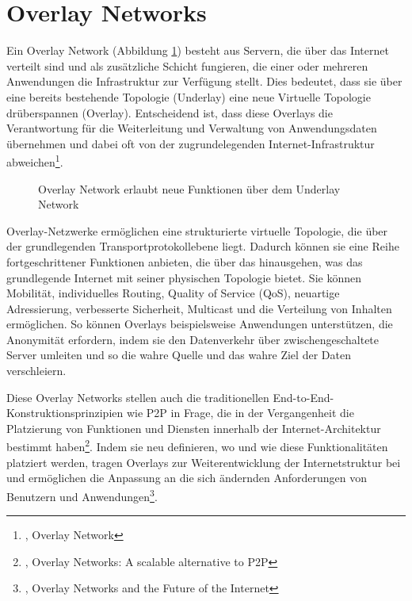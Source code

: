 \section{Overlay Networks}
\label{chap:overlay_networks}

Ein Overlay Network (Abbildung \ref{imgs:overlay_network}) besteht aus Servern, die über das Internet verteilt sind und als zusätzliche Schicht fungieren, die einer oder mehreren Anwendungen die Infrastruktur zur Verfügung stellt. Dies bedeutet, dass sie über eine bereits bestehende Topologie (Underlay) eine neue Virtuelle Topologie drüberspannen (Overlay). Entscheidend ist, dass diese Overlays die Verantwortung für die Weiterleitung und Verwaltung von Anwendungsdaten übernehmen und dabei oft von der zugrundelegenden Internet-Infrastruktur abweichen\footnote{\cite{OverlayNetwork}, Overlay Network}.

\begin{figure}[h!]
    \centering
    
    \caption{Overlay Network erlaubt neue Funktionen über dem Underlay Network}
    \label{imgs:overlay_network}
\end{figure}

Overlay-Netzwerke ermöglichen eine strukturierte virtuelle Topologie, die über der grundlegenden Transportprotokollebene liegt. Dadurch können sie eine Reihe fortgeschrittener Funktionen anbieten, die über das hinausgehen, was das grundlegende Internet mit seiner physischen Topologie bietet. Sie können Mobilität, individuelles Routing, Quality of Service (QoS), neuartige Adressierung, verbesserte Sicherheit, Multicast und die Verteilung von Inhalten ermöglichen. So können Overlays beispielsweise Anwendungen unterstützen, die Anonymität erfordern, indem sie den Datenverkehr über zwischengeschaltete Server umleiten und so die wahre Quelle und das wahre Ziel der Daten verschleiern.

Diese Overlay Networks stellen auch die traditionellen End-to-End-Konstruktionsprinzipien wie P2P in Frage, die in der Vergangenheit die Platzierung von Funktionen und Diensten innerhalb der Internet-Architektur bestimmt haben\footnote{\cite{AlternativeToP2P}, Overlay Networks: A scalable alternative to P2P}. Indem sie neu definieren, wo und wie diese Funktionalitäten platziert werden, tragen Overlays zur Weiterentwicklung der Internetstruktur bei und ermöglichen die Anpassung an die sich ändernden Anforderungen von Benutzern und Anwendungen\footnote{\cite{FutureOfTheInternet}, Overlay Networks and the Future of the Internet}.
